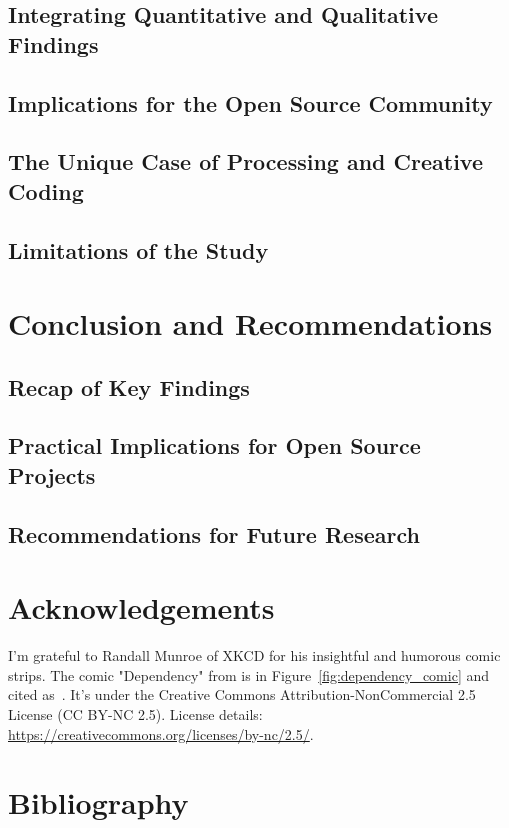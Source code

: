 \documentclass{article}
\newcommand{\getyear}[1]{\citeyear{#1}}
\begin{document}
\subsection{Integrating Quantitative and Qualitative Findings}
\subsection{Implications for the Open Source Community}
\subsection{The Unique Case of Processing and Creative Coding}
\subsection{Limitations of the Study}

\section{Conclusion and Recommendations}

\subsection{Recap of Key Findings}
\subsection{Practical Implications for Open Source Projects}
\subsection{Recommendations for Future Research}

\section{Acknowledgements}
I'm grateful to Randall Munroe of XKCD for his insightful and humorous comic strips. The comic "Dependency" from \getyear{munroeDependency2020} is in Figure~\ref{fig:dependency_comic} and cited as~\cite{munroeDependency2020}. It's under the Creative Commons Attribution-NonCommercial 2.5 License (CC BY-NC 2.5). License details: \url{https://creativecommons.org/licenses/by-nc/2.5/}.

\section{Bibliography}
\printbibliography
\end{document}
